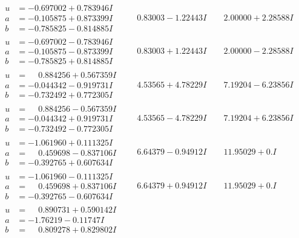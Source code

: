 \documentclass[1p]{elsarticle_modified}
\theoremstyle{definition}
\begin{document}
$$\begin{array}{c|c|c}
\begin{aligned}
u &= -0.697002 + 0.783946 I \\
a &= -0.105875 + 0.873399 I \\
b &= -0.785825 - 0.814885 I\end{aligned}
 & \phantom{-}0.83003 - 1.22443 I & \phantom{-}2.00000 + 2.28588 I \\ \hline\begin{aligned}
u &= -0.697002 - 0.783946 I \\
a &= -0.105875 - 0.873399 I \\
b &= -0.785825 + 0.814885 I\end{aligned}
 & \phantom{-}0.83003 + 1.22443 I & \phantom{-}2.00000 - 2.28588 I \\ \hline\begin{aligned}
u &= \phantom{-}0.884256 + 0.567359 I \\
a &= -0.044342 - 0.919731 I \\
b &= -0.732492 + 0.772305 I\end{aligned}
 & \phantom{-}4.53565 + 4.78229 I & \phantom{-}7.19204 - 6.23856 I \\ \hline\begin{aligned}
u &= \phantom{-}0.884256 - 0.567359 I \\
a &= -0.044342 + 0.919731 I \\
b &= -0.732492 - 0.772305 I\end{aligned}
 & \phantom{-}4.53565 - 4.78229 I & \phantom{-}7.19204 + 6.23856 I \\ \hline\begin{aligned}
u &= -1.061960 + 0.111325 I \\
a &= \phantom{-}0.459698 - 0.837106 I \\
b &= -0.392765 + 0.607634 I\end{aligned}
 & \phantom{-}6.64379 - 0.94912 I & \phantom{-}11.95029 + 0. I\phantom{ +0.000000I} \\ \hline\begin{aligned}
u &= -1.061960 - 0.111325 I \\
a &= \phantom{-}0.459698 + 0.837106 I \\
b &= -0.392765 - 0.607634 I\end{aligned}
 & \phantom{-}6.64379 + 0.94912 I & \phantom{-}11.95029 + 0. I\phantom{ +0.000000I} \\ \hline\begin{aligned}
u &= \phantom{-}0.890731 + 0.590142 I \\
a &= -1.76219 - 0.11747 I \\
b &= \phantom{-}0.809278 + 0.829802 I\end{aligned}

\end{array}$$
\end{document}
